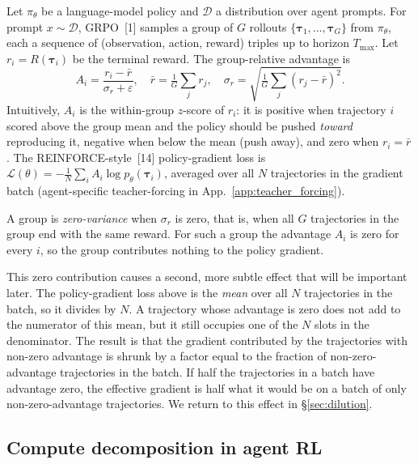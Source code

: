 \documentclass{article}
\begin{document}
Let $\pi_\theta$ be a language-model policy and $\mathcal{D}$ a
distribution over agent prompts. For prompt $x \!\sim\! \mathcal{D}$,
GRPO~[1] samples a group of $G$ rollouts
$\{\boldsymbol\tau_1, \dots, \boldsymbol\tau_G\}$ from $\pi_\theta$,
each a sequence of (observation, action, reward) triples up to horizon
$T_{\max}$. Let $r_i \!=\! R(\boldsymbol\tau_i)$ be the terminal
reward. The group-relative advantage is
\begin{equation}
A_i = \frac{r_i - \bar r}{\sigma_r + \varepsilon},
\quad
\bar r = \tfrac{1}{G}\!\sum_j r_j,
\quad
\sigma_r = \sqrt{\tfrac{1}{G}\!\sum_j (r_j - \bar r)^2}.
\label{eq:advantage}
\end{equation}
Intuitively, $A_i$ is the within-group $z$-score of $r_i$: it is
positive when trajectory $i$ scored above the group mean and the
policy should be pushed \emph{toward} reproducing it, negative when
below the mean (push away), and zero when $r_i\!=\!\bar r$. The
REINFORCE-style~[14] policy-gradient loss is
$\mathcal{L}(\theta) = -\tfrac{1}{N}\!\sum_i A_i \log p_\theta(\boldsymbol\tau_i)$,
averaged over all $N$ trajectories in the gradient batch
(agent-specific teacher-forcing in
App.~\ref{app:teacher_forcing}).

A group is \emph{zero-variance} when $\sigma_r$ is zero, that is,
when all $G$ trajectories in the group end with the same reward.
For such a group the advantage $A_i$ is zero for every $i$, so the
group contributes nothing to the policy gradient.

This zero contribution causes a second, more subtle effect that
will be important later. The policy-gradient loss above is the
\emph{mean} over all $N$ trajectories in the batch, so it divides
by $N$. A trajectory whose advantage is zero does not add to the
numerator of this mean, but it still occupies one of the $N$
slots in the denominator. The result is that the gradient
contributed by the trajectories with non-zero advantage is
shrunk by a factor equal to the fraction of non-zero-advantage
trajectories in the batch. If half the trajectories in a batch
have advantage zero, the effective gradient is half what it
would be on a batch of only non-zero-advantage trajectories. We
return to this effect in \S\ref{sec:dilution}.

\subsection{Compute decomposition in agent RL}
\label{sec:prelim_compute}
\end{document}
